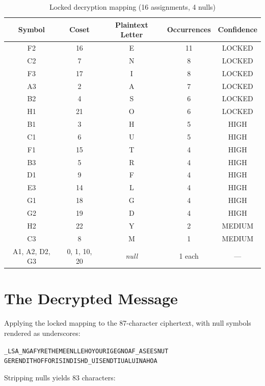 \documentclass[12pt,a4paper]{article}
\begin{document}
\begin{table}[H]
\centering
\caption{Locked decryption mapping (16 assignments, 4 nulls)}
\label{tab:mapping}
\begin{tabular}{ccccc}
\toprule
\textbf{Symbol} & \textbf{Coset} & \textbf{Plaintext Letter} & \textbf{Occurrences} & \textbf{Confidence}\\
\midrule
F2 & 16 & E & 11 & LOCKED\\
C2 & 7  & N & 8 & LOCKED\\
F3 & 17 & I & 8 & LOCKED\\
A3 & 2  & A & 7 & LOCKED\\
B2 & 4  & S & 6 & LOCKED\\
H1 & 21 & O & 6 & LOCKED\\
B1 & 3  & H & 5 & HIGH\\
C1 & 6  & U & 5 & HIGH\\
F1 & 15 & T & 4 & HIGH\\
B3 & 5  & R & 4 & HIGH\\
D1 & 9  & F & 4 & HIGH\\
E3 & 14 & L & 4 & HIGH\\
G1 & 18 & G & 4 & HIGH\\
G2 & 19 & D & 4 & HIGH\\
H2 & 22 & Y & 2 & MEDIUM\\
C3 & 8  & M & 1 & MEDIUM\\
\midrule
A1, A2, D2, G3 & 0, 1, 10, 20 & \textit{null} & 1 each & ---\\
\bottomrule
\end{tabular}
\end{table}

\section{The Decrypted Message}

Applying the locked mapping to the 87-character ciphertext, with null symbols rendered as underscores:

\begin{center}
\texttt{\_LSA\_NGAFYRETHEMEENLLEHOYOURIGEGNOAF\_ASEESNUT}\\[2pt]
\texttt{GERENDITHOFFORISINDISHD\_UISENDTIUALUINAHOA}
\end{center}

Stripping nulls yields 83 characters:
\end{document}

